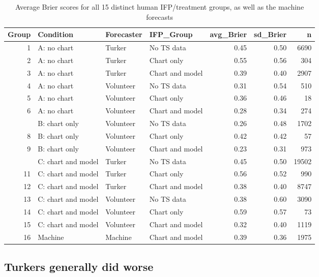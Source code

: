 \documentclass[]{article}
\begin{document}
\begin{table}

\caption{\label{tab:brier-by-forecaster-ifp-group-condition}Average Brier scores for all 15 distinct human IFP/treatment groups, as well as the machine forecasts}
\centering
\begin{tabular}[t]{rlllrrr}
\toprule
Group & Condition & Forecaster & IFP\_Group & avg\_Brier & sd\_Brier & n\\
\midrule
1 & A: no chart & Turker & No TS data & 0.45 & 0.50 & 6690\\
2 & A: no chart & Turker & Chart only & 0.55 & 0.56 & 304\\
3 & A: no chart & Turker & Chart and model & 0.39 & 0.40 & 2907\\
4 & A: no chart & Volunteer & No TS data & 0.31 & 0.54 & 510\\
5 & A: no chart & Volunteer & Chart only & 0.36 & 0.46 & 18\\
6 & A: no chart & Volunteer & Chart and model & 0.28 & 0.34 & 274\\
\addlinespace
7 & B: chart only & Volunteer & No TS data & 0.26 & 0.48 & 1702\\
8 & B: chart only & Volunteer & Chart only & 0.42 & 0.42 & 57\\
9 & B: chart only & Volunteer & Chart and model & 0.23 & 0.31 & 973\\
\addlinespace
10 & C: chart and model & Turker & No TS data & 0.45 & 0.50 & 19502\\
11 & C: chart and model & Turker & Chart only & 0.56 & 0.52 & 990\\
12 & C: chart and model & Turker & Chart and model & 0.38 & 0.40 & 8747\\
13 & C: chart and model & Volunteer & No TS data & 0.38 & 0.60 & 3090\\
14 & C: chart and model & Volunteer & Chart only & 0.59 & 0.57 & 73\\
15 & C: chart and model & Volunteer & Chart and model & 0.32 & 0.40 & 1119\\
16 & Machine & Machine & Chart and model & 0.39 & 0.36 & 1975\\
\bottomrule
\end{tabular}
\end{table}

\subsection{Turkers generally did
worse}\label{turkers-generally-did-worse}
\end{document}
